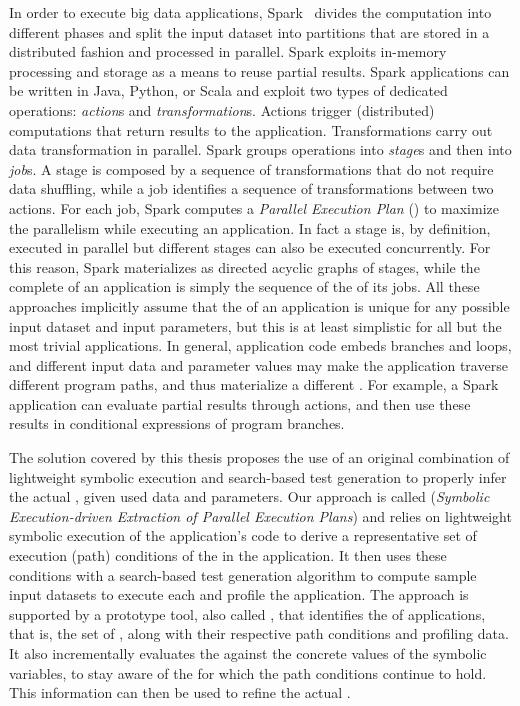 In order to execute big data applications, Spark~\cite{Zaharia2010} divides the computation into different phases and split the input dataset into partitions that are stored in a distributed fashion and processed in parallel. Spark exploits in-memory processing and storage as a means to reuse partial results. Spark applications can be written in Java, Python, or Scala and exploit two types of dedicated operations: \textit{action}s and \textit{transformation}s. 
Actions trigger (distributed) computations that return results to the application. Transformations carry out data transformation in parallel. Spark groups operations into \textit{stage}s and then into \textit{job}s. A stage is composed by a sequence of transformations that do not require data shuffling, while a job identifies a sequence of transformations between two actions. For each job, Spark computes a \textit{Parallel Execution Plan} (\plan) to maximize the parallelism while executing an application. In fact a stage is, by definition, executed in parallel but different stages can also be executed concurrently. For this reason, Spark materializes \plans as directed acyclic graphs of stages, while the complete \plan of an application is simply the sequence of the \plans of its jobs.
All these approaches implicitly assume that the \plan of an application is unique for any possible input dataset and input parameters, but this is at least simplistic for all but the most trivial applications. 
In general, application code embeds branches and loops, and different input data and parameter values may make the application traverse different program paths, and thus materialize a different \plan. For example, a Spark application can evaluate partial results through actions, and then use these results in conditional expressions of program branches.

The solution covered by this thesis proposes the use of an original combination of lightweight symbolic execution and search-based test generation to properly infer the actual \plan, given used data and parameters. Our approach is called \dSymb (\textit{Symbolic Execution-driven Extraction of Parallel Execution Plans})
and relies on lightweight symbolic execution of the application's code to derive a representative set of execution (path) conditions of the \plans in the application. It then uses these conditions with a search-based test generation algorithm to compute sample input datasets to execute each \plan and profile the application. The approach is supported by a prototype tool, also called \dSymb, that identifies the \model of applications, that is, the set of \plans, along with their respective path conditions and profiling data. It also incrementally evaluates the \model against the  concrete values of the symbolic variables, to stay aware of the \plans for which the path conditions continue to hold. This information can then be used to refine 
the actual \plan. 

